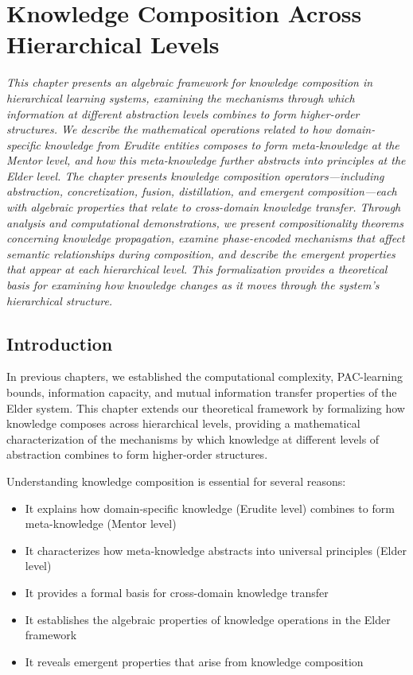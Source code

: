 \chapter{Knowledge Composition Across Hierarchical Levels}

\textit{This chapter presents an algebraic framework for knowledge composition in hierarchical learning systems, examining the mechanisms through which information at different abstraction levels combines to form higher-order structures. We describe the mathematical operations related to how domain-specific knowledge from Erudite entities composes to form meta-knowledge at the Mentor level, and how this meta-knowledge further abstracts into principles at the Elder level. The chapter presents knowledge composition operators—including abstraction, concretization, fusion, distillation, and emergent composition—each with algebraic properties that relate to cross-domain knowledge transfer. Through analysis and computational demonstrations, we present compositionality theorems concerning knowledge propagation, examine phase-encoded mechanisms that affect semantic relationships during composition, and describe the emergent properties that appear at each hierarchical level. This formalization provides a theoretical basis for examining how knowledge changes as it moves through the system's hierarchical structure.}

\section{Introduction}

In previous chapters, we established the computational complexity, PAC-learning bounds, information capacity, and mutual information transfer properties of the Elder system. This chapter extends our theoretical framework by formalizing how knowledge composes across hierarchical levels, providing a mathematical characterization of the mechanisms by which knowledge at different levels of abstraction combines to form higher-order structures.

Understanding knowledge composition is essential for several reasons:

\begin{itemize}
    \item It explains how domain-specific knowledge (Erudite level) combines to form meta-knowledge (Mentor level)
    \item It characterizes how meta-knowledge abstracts into universal principles (Elder level)
    \item It provides a formal basis for cross-domain knowledge transfer
    \item It establishes the algebraic properties of knowledge operations in the Elder framework
    \item It reveals emergent properties that arise from knowledge composition
\end{itemize}


